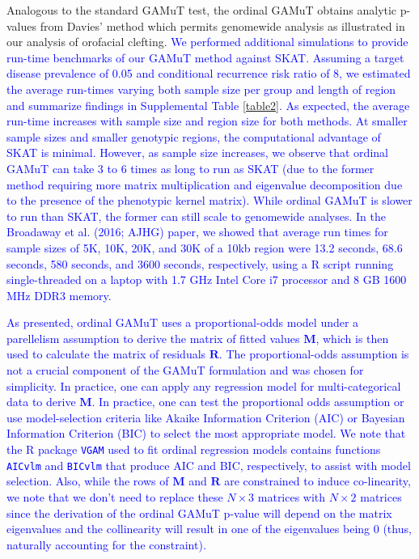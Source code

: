 \documentclass[]{article}
\begin{document}
Analogous to the standard GAMuT test, the ordinal GAMuT obtains analytic p-values from Davies' method \citep{Davies1980} which permits genomewide analysis as illustrated in our analysis of orofacial clefting. \textcolor{blue}{We performed additional simulations to provide run-time benchmarks of our GAMuT method against SKAT. Assuming a target disease prevalence of 0.05 and conditional recurrence risk ratio of 8, we estimated the average run-times varying both sample size per group and length of region and summarize findings in Supplemental Table \ref{table2}. As expected, the average run-time increases with sample size and region size for both methods. At smaller sample sizes and smaller genotypic regions, the computational advantage of SKAT is minimal. However, as sample size increases, we observe that ordinal GAMuT can take 3 to 6 times as long to run as SKAT (due to the former method requiring more matrix multiplication and eigenvalue decomposition due to the presence of the phenotypic kernel matrix). While ordinal GAMuT is slower to run than SKAT, the former can still scale to genomewide analyses. In the Broadaway et al. (2016; AJHG) paper, we showed that average run times for sample sizes of 5K, 10K, 20K, and 30K of a 10kb region were 13.2 seconds, 68.6 seconds, 580 seconds, and 3600 seconds, respectively, using a R script running single-threaded on a laptop with 1.7 GHz Intel Core i7 processor and 8 GB 1600 MHz DDR3 memory.}

\textcolor{blue}{As presented, ordinal GAMuT uses a proportional-odds model under a parellelism assumption to derive the matrix of fitted values $\mathbf{M}$, which is then used to calculate the matrix of residuals $\mathbf{R}$. The proportional-odds assumption is not a crucial component of the GAMuT formulation and was chosen for simplicity. In practice, one can apply any regression model for multi-categorical data to derive $\mathbf{M}$. In practice, one can test the proportional odds assumption or use model-selection criteria like Akaike Information Criterion (AIC) or Bayesian Information Criterion (BIC) to select the most appropriate model. We note that the R package \texttt{VGAM} used to fit ordinal regression models contains functions \texttt{AICvlm} and \texttt{BICvlm} that produce AIC and BIC, respectively, to assist with model selection. Also, while the rows of $\mathbf{M}$ and $\mathbf{R}$ are constrained to induce co-linearity, we note that we don't need to replace these $N \times 3$ matrices with $N \times 2$ matrices since the derivation of the ordinal GAMuT p-value will depend on the matrix eigenvalues and the collinearity will result in one of the eigenvalues being 0 (thus, naturally accounting for the constraint). }
\end{document}
